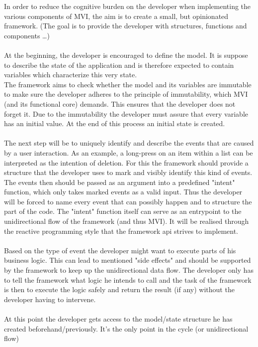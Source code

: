 In order to reduce the cognitive burden on the developer when implementing the various components of MVI, the aim 
is to create a small, but opinionated framework. (The goal is to provide the developer with structures, functions and components \dots) 
\\
\\
At the beginning, the developer is encouraged to define the model. It is suppose to describe the state of the application and is therefore expected to contain
variables which characterize this very state.\\
The framework aims to check whether the model and its variables are immutable to make sure the developer adheres to the principle of immutability,
which MVI (and its functional core) demands. This ensures that the developer does not forget it. Due to the immutability the developer must assure that every variable
has an initial value. At the end of this process an initial state is created.
\\
\\
The next step will be to uniquely identify and describe the events that are caused by a user interaction.
As an example, a long-press on an item within a list can be interpreted as the intention of deletion. 
For this the framework should provide a structure that the developer uses to mark and visibly identify this kind of events.
The events then should be passed as an argument into a predefined "intent" function, which only takes marked events as a valid input.
Thus the developer will be forced to name every event that can possibly happen and to structure the part of the code.
The "intent" function itself can serve as an entrypoint to the unidirectional flow of the framework (and thus MVI). It will be realised 
through the reactive programming style that the framework api strives to implement.
\\
\\
Based on the type of event the developer might want to execute parts of his business logic. This can lead to mentioned "side effects" and
should be supported by the framework to keep up the unidirectional data flow. The developer only has to tell the framework what logic he intends to call and 
the task of the framework is then to execute the logic safely and return the result (if any) without the developer having to intervene.
\\
\\
At this point the developer gets access to the model/state structure he has created beforehand/previously. It's the only point in the cycle (or unidirectional flow) 
